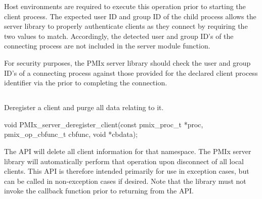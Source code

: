 \advicermstart
Host environments are required to execute this operation prior to starting the client process.
The expected user ID and group ID of the child process allows the server library to properly authenticate clients as they connect by requiring the two values to match. Accordingly, the detected user and group ID's of the connecting process are not included in the  server module function.
\advicermend

\adviceimplstart
For security purposes, the \ac{PMIx} server library should check the user and group ID's of a connecting process against those provided for the declared client process identifier via the  prior to completing the connection.
\adviceimplend


\subsection{}

\summary

Deregister a client and purge all data relating to it.

\format

\cspecificstart
\begin{codepar}
void
PMIx_server_deregister_client(const pmix_proc_t *proc,
                        pmix_op_cbfunc_t cbfunc, void *cbdata);
\end{codepar}
\cspecificend

\begin{arglist}
\end{arglist}


\descr

The  \ac{API} will delete all client information for that namespace. The \ac{PMIx} server library will automatically perform that operation upon disconnect of all local clients.
This \ac{API} is therefore intended primarily for use in exception cases, but can be called in non-exception cases if desired. Note that the library must not invoke the callback function prior to returning from the \ac{API}.


